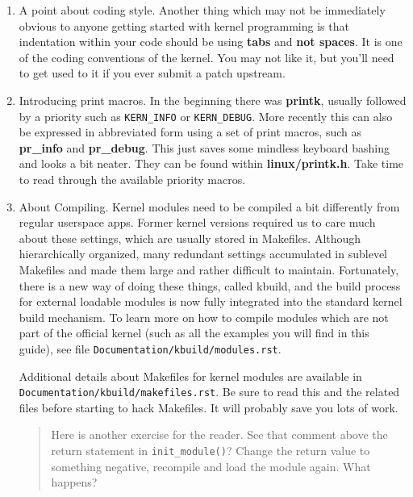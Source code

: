 \documentclass[10pt, oneside]{book}
\begin{document}
\begin{enumerate}
  \item A point about coding style.
        Another thing which may not be immediately obvious to anyone getting started with kernel programming is that indentation within your code should be using \textbf{tabs} and \textbf{not spaces}.
        It is one of the coding conventions of the kernel.
        You may not like it, but you'll need to get used to it if you ever submit a patch upstream.

  \item Introducing print macros.
        In the beginning there was \textbf{printk}, usually followed by a priority such as \verb|KERN_INFO| or \verb|KERN_DEBUG|.
        More recently this can also be expressed in abbreviated form using a set of print macros, such as \textbf{pr\_info} and \textbf{pr\_debug}.
        This just saves some mindless keyboard bashing and looks a bit neater.
        They can be found within \textbf{linux/printk.h}.
        Take time to read through the available priority macros.

  \item About Compiling.
        Kernel modules need to be compiled a bit differently from regular userspace apps.
        Former kernel versions required us to care much about these settings, which are usually stored in Makefiles.
        Although hierarchically organized, many redundant settings accumulated in sublevel Makefiles and made them large and rather difficult to maintain.
        Fortunately, there is a new way of doing these things, called kbuild, and the build process for external loadable modules is now fully integrated into the standard kernel build mechanism.
        To learn more on how to compile modules which are not part of the official kernel (such as all the examples you will find in this guide), see file \verb|Documentation/kbuild/modules.rst|.

Additional details about Makefiles for kernel modules are available in \verb|Documentation/kbuild/makefiles.rst|. Be sure to read this and the related files before starting to hack Makefiles. It will probably save you lots of work.

\begin{quote}
Here is another exercise for the reader.
See that comment above the return statement in \verb|init_module()|?
Change the return value to something negative, recompile and load the module again.
What happens?
\end{quote}
\end{enumerate}
\end{document}
